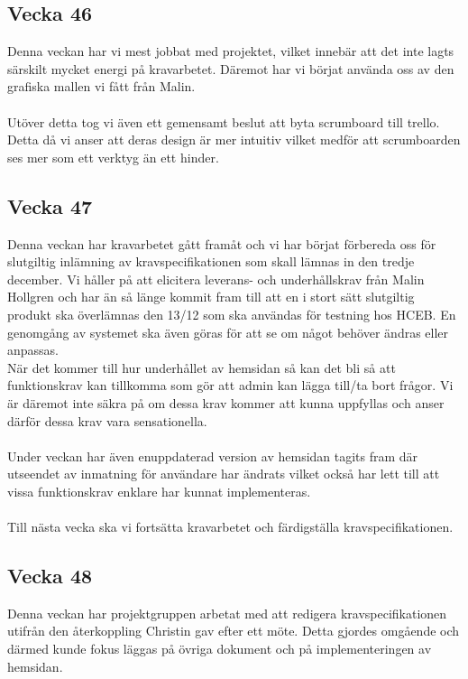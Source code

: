 \documentclass[12pt]{article}
\begin{document}
	\subsection{Vecka 46}
Denna veckan har vi mest jobbat med projektet, vilket innebär att det inte lagts särskilt mycket energi på kravarbetet. Däremot har vi börjat använda
oss av den grafiska mallen vi fått från Malin.
\\
\\
Utöver detta tog vi även ett gemensamt beslut att byta scrumboard till trello. Detta då vi anser att deras design är mer intuitiv vilket medför att
scrumboarden ses mer som ett verktyg än ett hinder.

\subsection{Vecka 47}
 Denna veckan har kravarbetet gått framåt och vi har börjat förbereda oss för slutgiltig inlämning av kravspecifikationen som skall lämnas in den tredje december. Vi håller på att elicitera leverans- och underhållskrav från Malin Hollgren och har än så länge kommit fram till att en i stort sätt slutgiltig produkt ska överlämnas den 13/12 som ska användas för testning hos HCEB. En genomgång av systemet ska även göras för att se om något behöver ändras eller anpassas.\\ När det kommer till hur underhållet av hemsidan så kan det bli så att funktionskrav kan tillkomma som gör att admin kan lägga till/ta bort frågor. Vi är däremot inte säkra på om dessa krav kommer att kunna uppfyllas och anser därför dessa krav vara sensationella. \\\\
 Under veckan har även enuppdaterad version av hemsidan tagits fram där utseendet av inmatning för användare har ändrats vilket också har lett till att vissa funktionskrav enklare har kunnat implementeras. \\\\
 Till nästa vecka ska vi fortsätta kravarbetet och färdigställa kravspecifikationen.
 \newpage
 \subsection{Vecka 48}
 Denna veckan har projektgruppen arbetat med att redigera kravspecifikationen utifrån den återkoppling Christin gav efter ett möte. Detta gjordes omgående och därmed kunde fokus läggas på övriga dokument och på implementeringen av hemsidan. \\\\
 
\end{document}
